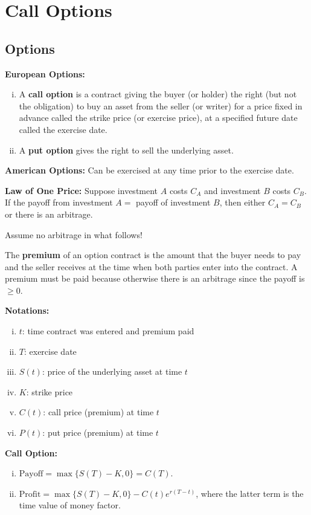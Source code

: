 \section{Call Options}
\subsection{Options}
\textbf{European Options: }
\begin{enumerate}[i.]
    \item A \textbf{call option} is a contract giving the buyer (or holder) the right (but not the obligation) to buy an asset from the seller (or writer) for a price fixed in advance called the strike price (or exercise price), at a specified future date called the exercise date.

    \item A \textbf{put option} gives the right to sell the underlying asset.
\end{enumerate}

\textbf{American Options: } Can be exercised at any time prior to the exercise date.

\textbf{Law of One Price: } Suppose investment \(A\) costs \(C_A\) and investment \(B\) costs \(C_B\). If the payoff from investment \(A = \) payoff of investment \(B\), then either \(C_A = C_B\) or there is an arbitrage.

Assume no arbitrage in what follows!

The \textbf{premium} of an option contract is the amount that the buyer needs to pay and the seller receives at the time when both parties enter into the contract. A premium must be paid because otherwise there is an arbitrage since the payoff is \(\ge 0\).

\textbf{Notations: }
\begin{enumerate}[i.]
    \item \(t\): time contract was entered and premium paid
    \item \(T\): exercise date
    \item \(S(t)\): price of the underlying asset at time \(t\)
    \item \(K\): strike price
    \item \(C(t)\): call price (premium) at time \(t\)
    \item \(P(t)\): put price (premium) at time \(t\)
\end{enumerate}

\textbf{Call Option: }
\begin{enumerate}[i.]
    \item \(\text{Payoff} = \max \{S(T) - K, 0\} = C(T)\).
    \item \(\text{Profit} = \max \{S(T) - K, 0\} - C(t)e^{r(T-t)}\), where the latter term is the time value of money factor.
\end{enumerate}

